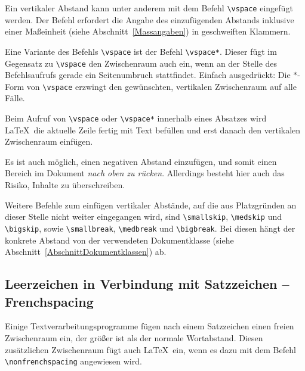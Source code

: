 \documentclass[a4paper,10pt,twoside]{scrbook}
\begin{document}

Ein vertikaler Abstand kann unter anderem mit dem Befehl
\verb!\vspace! 
eingefügt werden. Der Befehl erfordert die Angabe des 
einzufügenden Abstands inklusive einer Maßeinheit 
(siehe Abschnitt~\ref{Massangaben}) in geschweiften Klammern.





Eine Variante des Befehls \verb!\vspace! ist der Befehl 
\verb!\vspace*!. Dieser fügt im
Gegensatz zu \verb!\vspace! den Zwischenraum 
auch ein, wenn an der Stelle des
Befehlsaufrufs gerade ein Seitenumbruch 
stattfindet. Einfach ausgedrückt: 
Die $\ast$-Form von 
\verb!\vspace! erzwingt den gewünschten, 
vertikalen Zwischenraum auf alle
Fälle. 


Beim Aufruf von \verb!\vspace! oder \verb!\vspace*! 
innerhalb eines Absatzes wird \LaTeX\ die aktuelle Zeile fertig 
mit Text befüllen und erst danach den 
vertikalen Zwischenraum einfügen.

Es ist auch möglich, einen negativen
Abstand einzufügen, und somit einen Bereich im Dokument \textsl{nach oben zu rücken}. 
Allerdings besteht hier auch das Risiko, Inhalte zu überschreiben.


Weitere Befehle zum einfügen vertikaler Abstände, auf die aus Platzgründen an dieser Stelle nicht weiter eingegangen wird, sind \verb!\smallskip!, \verb!\medskip! und \verb!\bigskip!, sowie \verb!\smallbreak!, \verb!\medbreak! und \verb!\bigbreak!. Bei diesen hängt der konkrete Abstand von der verwendeten Dokumentklasse (siehe Abschnitt~\ref{AbschnittDokumentklassen}) ab.


\subsection{Leerzeichen in Verbindung mit Satzzeichen -- Frenchspacing}


Einige Textverarbeitungsprogramme fügen nach einem Satzzeichen einen freien Zwischenraum ein, der größer ist als der normale Wortabstand. Diesen zusätzlichen Zwischenraum fügt auch \LaTeX\ ein, wenn es dazu mit dem Befehl \verb!\nonfrenchspacing! angewiesen wird. 


\end{document}
